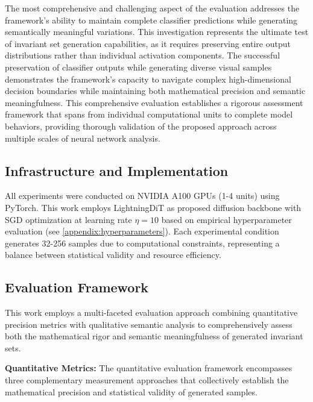 The most comprehensive and challenging aspect of the evaluation addresses the framework's ability to maintain complete classifier predictions while generating semantically meaningful variations. This investigation represents the ultimate test of invariant set generation capabilities, as it requires preserving entire output distributions rather than individual activation components. The successful preservation of classifier outputs while generating diverse visual samples demonstrates the framework's capacity to navigate complex high-dimensional decision boundaries while maintaining both mathematical precision and semantic meaningfulness. This comprehensive evaluation establishes a rigorous assessment framework that spans from individual computational units to complete model behaviors, providing thorough validation of the proposed approach across multiple scales of neural network analysis.

\subsection{Infrastructure and Implementation}

All experiments were conducted on NVIDIA A100 GPUs (1-4 units) using PyTorch. This work employs LightningDiT as proposed diffusion backbone with SGD optimization at learning rate $\eta = 10$ based on empirical hyperparameter evaluation (see \cref{appendix:hyperparameters}). Each experimental condition generates 32-256 samples due to computational constraints, representing a balance between statistical validity and resource efficiency.

\subsection{Evaluation Framework}

This work employs a multi-faceted evaluation approach combining quantitative precision metrics with qualitative semantic analysis to comprehensively assess both the mathematical rigor and semantic meaningfulness of generated invariant sets.

\textbf{Quantitative Metrics:} The quantitative evaluation framework encompasses three complementary measurement approaches that collectively establish the mathematical precision and statistical validity of generated samples. 

